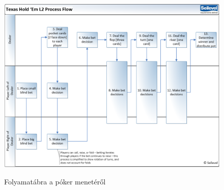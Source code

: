 \begin{figure}[h]
\centering
\includegraphics[scale=0.4]{images/process-flow.png}
\caption{Folyamatábra a póker menetéről}
\cite{process-flow}
\label{fig:process-flow}
\end{figure}

